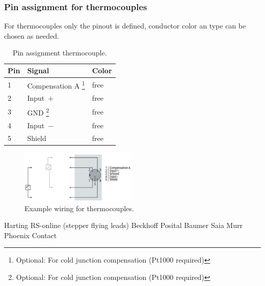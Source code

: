 \subsubsection{Pin assignment for thermocouples}
For thermocouples only the pinout is defined, conductor color an type can be chosen as needed.

\begin{table}[H]
\centering
\caption{\label{tab:TCPinout}Pin assignment thermocouple.}
\begin{tabular}{@{}p{1cm}p{4cm}p{4cm}@{}}
\toprule
Pin & Signal & Color             \\ \midrule
1   & Compensation A \footnote{Optional: For cold junction compensation (Pt1000 required)}   & free \\ \midrule
2   & Input~$+$           & free \\ \midrule
3   & GND \footnote{Optional: For cold junction compensation (Pt1000 required)}              & free \\ \midrule
4   & Input~$-$           & free  \\ \midrule
5   & Shield            & free  \\ \bottomrule
\end{tabular}
\end{table}

\begin{figure}[H]
\centering
\includegraphics[width=0.5\textwidth]{Figures/ThermocoupleWiring.jpg}
\caption{\label{fig:ThermocoupleWiring}Example wiring for thermocouples.}
\end{figure}


Harting
RS-online (stepper flying leads)
Beckhoff
Posital
Baumer
Saia
Murr
Phoenix Contact

\cite{BeckhoffWeb}
\cite{HartingWeb}






